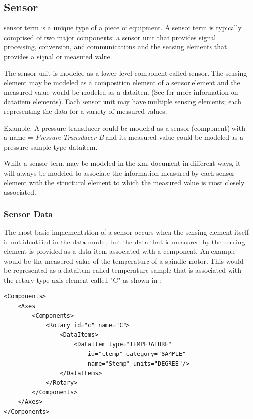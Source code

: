 \subsection{Sensor} \label{sec:Sensor}

\gls{sensor term} is a unique type of a piece of equipment.  A \gls{sensor term} is typically comprised of two major components: a \gls{sensor unit} that provides signal processing, conversion, and communications and the \glspl{sensing element} that provides a signal or measured value.

The \gls{sensor unit} is modeled as a \gls{lower level} \gls{component} called \gls{sensor}.  The \gls{sensing element} may be modeled as a \gls{composition} element of a \gls{sensor} element and the measured value would be modeled as a \gls{dataitem} (See  for more information on \gls{dataitem} elements).  Each \gls{sensor unit} may have multiple \glspl{sensing element}; each representing the data for a variety of measured values.

Example:  A pressure transducer could be modeled as a \gls{sensor} (\gls{component}) with a \gls{name} = \textit{Pressure Transducer B} and its measured value could be modeled as a \gls{pressure sample} type \gls{dataitem}.

While a \gls{sensor term} may be modeled in the \gls{xml} document in different ways, it will always be modeled to associate the information measured by each \gls{sensor element} with the \gls{structural element} to which the measured value is most closely associated.   

\subsubsection{Sensor Data}

The most basic implementation of a sensor occurs when the \gls{sensing element} itself is not identified in the data model, but the data that is measured by the \gls{sensing element} is provided as a data item associated with a \gls{component}.  An example would be the measured value of the temperature of a spindle motor.  This would be represented as a \gls{dataitem} called \gls{temperature sample} that is associated with the \gls{rotary} type axis element called "C" as shown in :

\newpage 

\begin{lstlisting}[firstnumber=1,escapechar=|,%
    caption={Example of Sensing Element provided as data item associated with a Component}, label={lst:example-of-sensing-element}]
<Components>
    <Axes
        <Components>
            <Rotary id="c" name="C">
                <DataItems>
                    <DataItem type="TEMPERATURE" 
                        id="ctemp" category="SAMPLE" 
                        name="Stemp" units="DEGREE"/>
                </DataItems>
            </Rotary>
        </Components>
    </Axes>
</Components>
\end{lstlisting}

